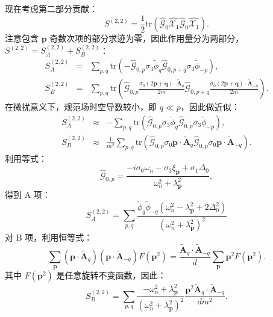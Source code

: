 \documentclass[10pt,UTF8]{ctexart}
\begin{document}
现在考虑第二部分贡献：
\begin{equation}
	S^{(2,2)} 
	= \frac{1}{2} \mathrm{tr}\left(\hat{\mathcal G}_0 \hat{\mathcal X_1} \hat{\mathcal G}_0 \hat{\mathcal X_1}\right).
\end{equation}
注意包含 $\bm p$ 奇数次项的部分求迹为零，因此作用量分为两部分，$S^{(2,2)} = S^{(2,2)}_A+S^{(2,2)}_B$：
\begin{eqnarray}
	S^{(2,2)}_A
	&=& \sum_{p,q} \mathrm{tr}\left(-\hat{\mathcal G}_{0,p} \sigma_3 \tilde\phi_{q} \hat{\mathcal G}_{0,p+q}\sigma_3 \tilde\phi_{-p} \right), \\
	S^{(2,2)}_B
	&=& \sum_{p,q} \mathrm{tr} \left(\hat{\mathcal G}_{0,p} \frac{\sigma_0(2\bm p + \bm q)\cdot \tilde{\bm A}_{q}}{2m} \hat{\mathcal G}_{0,p+q} \frac{\sigma_0 (2\bm p + \bm q)\cdot \tilde{\bm A}_{-q}}{2m}\right).
\end{eqnarray}
在微扰意义下，规范场时空导数较小，即 $q \ll p$，因此做近似：
\begin{eqnarray}
	S^{(2,2)}_A
	&\approx& -\sum_{p,q} \mathrm{tr}\left(\hat{\mathcal G}_{0,p} \sigma_3 \tilde\phi_{q} \hat{\mathcal G}_{0,p}\sigma_3 \tilde\phi_{-p} \right), \\
	S^{(2,2)}_B
	&\approx& \frac{1}{m^2}\sum_{p,q} \mathrm{tr} \left(\hat{\mathcal G}_{0,p} \sigma_0 \bm p \cdot \tilde{\bm A}_{q} \hat{\mathcal G}_{0,p} \sigma_0 \bm p \cdot \tilde{\bm A}_{-q} \right).
\end{eqnarray}
利用等式：
\begin{equation}
	\hat{\mathcal G}_{0,p} = \frac{-i\sigma_0 \omega_n-\sigma_3\xi_{\bm p}+\sigma_1 \Delta_0}{\omega_n^2+\lambda_{\bm p}^2},
\end{equation}
得到 A 项：
\begin{equation}
	S^{(2,2)}_A = \sum_{p,q} \frac{\tilde\phi_{q} \tilde\phi_{-q}(\omega_n^2-\lambda_{\bm p}^2+2\Delta_0^2)}{(\omega_n^2+\lambda_{\bm p}^2)^2}
\end{equation}
对 B 项，利用恒等式：
\begin{equation}
	\sum_{\bm p}(\bm p \cdot \tilde{\bm A}_{q})(\bm p \cdot \tilde{\bm A}_{-q})F(\bm p^2) 
	= \frac{\tilde{\bm A}_{q} \cdot \tilde{\bm A}_{-q}}{d} \sum_{\bm p} \bm p^2 F(\bm p^2). 
\end{equation}
其中 $F(\bm p^2)$ 是任意旋转不变函数，因此：
\begin{equation}
	S^{(2,2)}_B 
	= \sum_{p,q} \frac{-\omega_n^2+\lambda_{\bm p}^2}{(\omega_n^2+\lambda_{\bm p}^2)^2} \frac{\bm p^2 \tilde{\bm A}_{q} \cdot \tilde{\bm A}_{-q}}{d m^2}.
\end{equation}
\end{document}
